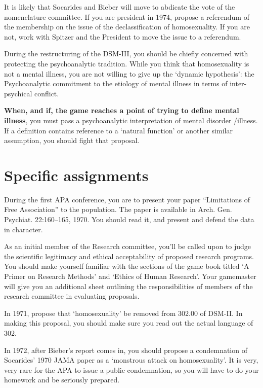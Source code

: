 \begin{refsection}
It is likely that Socarides and Bieber will move to abdicate the vote of the nomenclature committee. If you are president in 1974, propose a referendum of the membership on the issue of the declassification of homosexuality. If you are not, work with Spitzer and the President to move the issue to a referendum.

During the restructuring of the DSM-III, you should be chiefly concerned with protecting the psychoanalytic tradition. While you think that homosexuality is not a mental illness, you are not willing to give up the `dynamic hypothesis': the Psychoanalytic commitment to the etiology of mental illness in terms of inter-psychical conflict.

\textbf{When, and if, the game reaches a point of trying to define mental illness}, you must pass a psychoanalytic interpretation of mental disorder \slash  illness. If a definition contains reference to a `natural function' or another similar assumption, you should fight that proposal.

\section{Specific assignments}
\label{specificassignments}

During the first APA conference, you are to present your paper ``Limitations of Free Association'' to the population. The paper is available in Arch. Gen. Psychiat. 22:160--165, 1970. You should read it, and present and defend the data in character.

As an initial member of the Research committee, you'll be called upon to judge the scientific legitimacy and ethical acceptability of proposed research programs. You should make yourself familiar with the sections of the game book titled `A Primer on Research Methods' and `Ethics of Human Research'. Your gamemaster will give you an additional sheet outlining the responsibilities of members of the research committee in evaluating proposals.

In 1971, propose that `homosexuality' be removed from 302.00 of DSM-II. In making this proposal, you should make sure you read out the actual language of 302.

In 1972, after Bieber's report comes in, you should propose a condemnation of Socarides' 1970 JAMA paper as a `monstrous attack on homosexuality'. It is very, very rare for the APA to issue a public condemnation, so you will have to do your homework and be seriously prepared.


\end{refsection}
